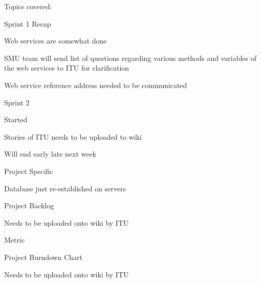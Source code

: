 Topics covered:
\begin{my_itemize}
\item Sprint 1 Recap

	\begin{my_itemize}
	\item Web services are somewhat done

	\item SMU team will send list of questions regarding various methods and variables of the web services to ITU for clarification

	\item Web service reference address needed to be communicated
	\end{my_itemize}

\item Sprint 2

	\begin{my_itemize}
	\item Started

	\item Stories of ITU needs to be uploaded to wiki

	\item Will end early late next week
	\end{my_itemize}

\item Project Specific

	\begin{my_itemize}
	\item Database just re-established on servers
	\end{my_itemize}

\item Project Backlog

	\begin{my_itemize}
	\item Needs to be uploaded onto wiki by ITU
	\end{my_itemize}

\item Metric

	\begin{my_itemize}
	\item Project Burndown Chart

		\begin{my_itemize}
		\item Needs to be uploaded onto wiki by ITU
		\end{my_itemize}

	\end{my_itemize}

\end{my_itemize}

